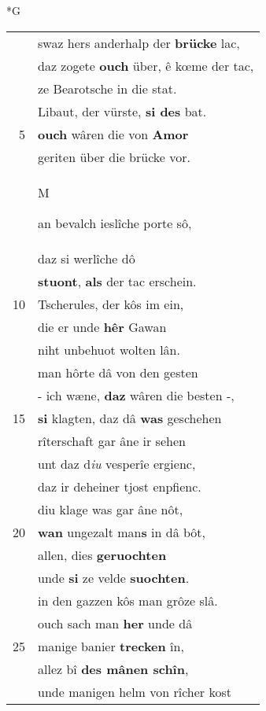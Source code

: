 \documentclass[8pt,a4paper,notitlepage]{article}
\begin{document}
\newpage
\begin{table}[ht]
\begin{minipage}[t]{0.5\linewidth}
\small
\begin{center}*G
\end{center}
\begin{tabular}{rl}
 & swaz hers anderhalp der \textbf{brücke} lac,\\ 
 & daz zogete \textbf{ouch} über, ê kœme der tac,\\ 
 & ze Bearotsche in die stat.\\ 
 & Libaut, der vürste, \textbf{si des} bat.\\ 
5 & \textbf{ouch} wâren die von \textbf{Amor}\\ 
 & geriten über die brücke vor.\\ 
 & \begin{large}M\end{large}an bevalch ieslîche porte sô,\\ 
 & daz si werlîche dô\\ 
 & \textbf{stuont}, \textbf{als} der tac erschein.\\ 
10 & Tscherules, der kôs im ein,\\ 
 & die er unde \textbf{hêr} Gawan\\ 
 & niht unbehuot wolten lân.\\ 
 & man hôrte dâ von den gesten\\ 
 & - ich wæne, \textbf{daz} wâren die besten -,\\ 
15 & \textbf{si} klagten, daz dâ \textbf{was} geschehen\\ 
 & rîterschaft gar âne ir sehen\\ 
 & unt daz d\textit{iu} vesperîe ergienc,\\ 
 & daz ir deheiner tjost enpfienc.\\ 
 & diu klage was gar âne nôt,\\ 
20 & \textbf{wan} ungezalt man\textbf{s} in dâ bôt,\\ 
 & allen, dies \textbf{geruochten}\\ 
 & unde \textbf{si} ze velde \textbf{suochten}.\\ 
 & in den gazzen kôs man grôze slâ.\\ 
 & ouch sach man \textbf{her} unde dâ\\ 
25 & manige banier \textbf{trecken} în,\\ 
 & allez bî \textbf{des mânen schîn},\\ 
 & unde manigen helm von rîcher kost\\ 

\end{tabular}
\end{minipage}
\end{table}
\end{document}

